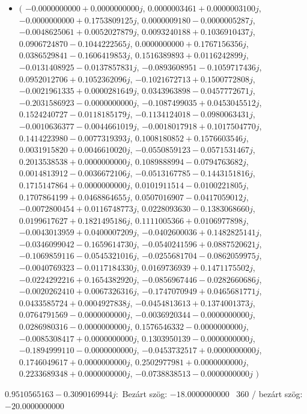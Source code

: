 \documentclass[14pt,a4paper]{article}
\begin{document}
\begin{itemize}
\item
$\big($
$-0.0000000000+0.0000000000j$, $0.0000003461+0.0000003100j$, $-0.0000000000+0.1753809125j$, $0.0000009180-0.0000005287j$, $-0.0048625061+0.0052027879j$, $0.0093240188+0.1036910437j$, $0.0906724870-0.1044222565j$, $0.0000000000+0.1767156356j$, $0.0386529841-0.1606419853j$, $0.1516389893+0.0116242899j$, $-0.0131408925-0.0137857831j$, $-0.0893608951-0.1059717436j$, $0.0952012706+0.1052362096j$, $-0.1021672713+0.1500772808j$, $-0.0021961335+0.0000281649j$, $0.0343963898-0.0457772671j$, $-0.2031586923-0.0000000000j$, $-0.1087499035+0.0453045512j$, $0.1524240727-0.0118185179j$, $-0.1134124018-0.0980063431j$, $-0.0010636377-0.0044661019j$, $-0.0018017918+0.1017504770j$, $0.1414223980-0.0077319393j$, $0.1008180852+0.1576603546j$, $0.0031915820+0.0046610020j$, $-0.0550859123-0.0571531467j$, $0.2013538538+0.0000000000j$, $0.1089888994-0.0794763682j$, $0.0014813912-0.0036672106j$, $-0.0513167785-0.1443151816j$, $0.1715147864+0.0000000000j$, $0.0101911514-0.0100221805j$, $0.1707864199+0.0468864655j$, $0.0507016907-0.0417059012j$, $-0.0072800454+0.0116748773j$, $0.0228093630-0.1383068660j$, $0.0199617627+0.1821495186j$, $0.1111005366+0.0106977898j$, $-0.0043013959+0.0400007209j$, $-0.0402600036+0.1482825141j$, $-0.0346099042-0.1659614730j$, $-0.0540241596+0.0887520621j$, $-0.1069859116-0.0545321016j$, $-0.0255681704-0.0862059975j$, $-0.0040769323-0.0117184330j$, $0.0169736939+0.1471175502j$, $-0.0224292216+0.1654382920j$, $-0.0856967446-0.0282660686j$, $-0.0020262410+0.0067326316j$, $-0.1747070949+0.0465681771j$, $0.0433585724+0.0004927838j$, $-0.0454813613+0.1374001373j$, $0.0764791569-0.0000000000j$, $-0.0036920344-0.0000000000j$, $0.0286980316-0.0000000000j$, $0.1576546332-0.0000000000j$, $-0.0085308417+0.0000000000j$, $0.1303950139-0.0000000000j$, $-0.1894999110-0.0000000000j$, $-0.0453732517+0.0000000000j$, $0.1746049617+0.0000000000j$, $0.2502977981+0.0000000000j$, $0.2233689348+0.0000000000j$, $-0.0738838513-0.0000000000j$
$\big)$
\end{itemize}
$0.9510565163-0.3090169944j$:\
Bezárt szög: $-18.0000000000$ \
360 / bezárt szög: $-20.0000000000$\
\end{document}
